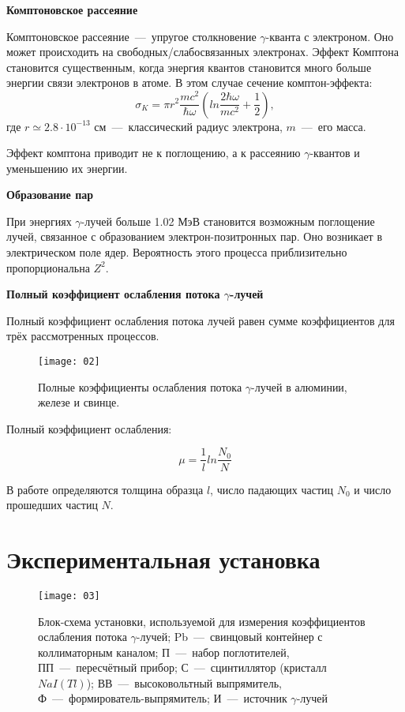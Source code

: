 \documentclass{physlab}
\begin{document}
\textbf{Комптоновское рассеяние}

Комптоновское рассеяние~---~упругое столкновение $\gamma$-кванта с электроном. Оно может происходить на свободных/слабосвязанных электронах. Эффект Комптона становится существенным, когда энергия квантов становится много больше энергии связи электронов в атоме. В этом случае сечение комптон-эффекта:
\begin{equation}
    \sigma_K=\pi r^2 \dfrac{mc^2}{\hbar \omega}\left(ln\frac{2\hbar\omega}{mc^2}+\frac{1}{2}\right),
\end{equation}
где $r\simeq 2.8 \cdot 10^{-13}$ см~---~классический радиус электрона, $m$~---~его масса.
	
Эффект комптона приводит не к поглощению, а к рассеянию $\gamma$-квантов и уменьшению их энергии.

\textbf{Образование пар}

При энергиях $\gamma$-лучей больше 1.02 МэВ становится возможным поглощение лучей, связанное с образованием электрон-позитронных пар. Оно возникает в электрическом поле ядер. Вероятность этого процесса приблизительно пропорциональна $Z^2$.
	   
\textbf{Полный коэффициент ослабления потока $\gamma$-лучей}
	 
Полный коэффициент ослабления потока лучей равен сумме коэффициентов для трёх рассмотренных процессов. 
	
\begin{figure}
\centering
    \texttt{[image: 02]}
\caption{Полные коэффициенты ослабления потока $\gamma$-лучей в алюминии, железе и свинце.}
\end{figure}
	
 	Полный коэффициент ослабления:
 	
 	\begin{equation}
 	\mu=\frac{1}{l}ln\frac{N_0}{N}
 	\end{equation}
	
	В работе определяются толщина образца $l$, число падающих частиц $N_0$ и число прошедших частиц $N$.
	
\section{Экспериментальная установка}
	
\begin{figure} [h!]
	\centering
    \texttt{[image: 03]}
	\caption{Блок-схема установки, используемой для измерения коэффициентов ослабления потока $\gamma$-лучей; Pb~---~свинцовый контейнер с коллиматорным каналом; П~---~набор поглотителей, ПП~---~пересчётный прибор; С~---~сцинтиллятор (кристалл $NaI(Tl)$); ВВ~---~высоковольтный выпрямитель, Ф~---~формирователь-выпрямитель; И~---~источник $\gamma$-лучей}
\end{figure}
\end{document}
